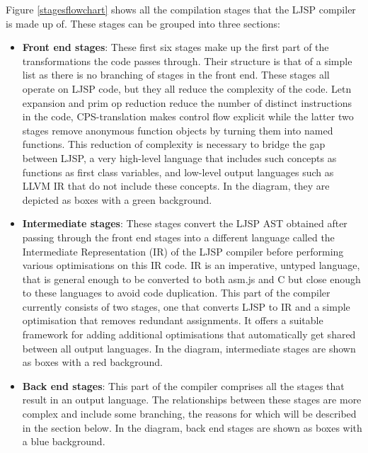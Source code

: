 \documentclass[11pt]{report}
\begin{document}
Figure \ref{stagesflowchart} shows all the compilation stages that the LJSP compiler is made up of. These stages  can be grouped into three sections:
\begin{itemize}
\item \textbf{Front end stages}: These first six stages make up the first part of the transformations the code passes through. Their structure is that of a simple list as there is no branching of stages in the front end. These stages all operate on LJSP code, but they all reduce the complexity of the code. Letn expansion and prim op reduction reduce the number of distinct instructions in the code, CPS-translation makes control flow explicit while the latter two stages remove anonymous function objects by turning them into named functions. This reduction of complexity is necessary to bridge the gap between LJSP, a very high-level language that includes such concepts as functions as first class variables, and low-level output languages such as LLVM IR that do not include these concepts. In the diagram, they are depicted as boxes with a green background.

\item \textbf{Intermediate stages}: These stages convert the LJSP AST obtained after passing through the front end stages into a different language called the Intermediate Representation (IR) of the LJSP compiler before performing various optimisations on this IR code. IR is an imperative, untyped language, that is general enough to be converted to both asm.js and C but close enough to these languages to avoid code duplication. This part of the compiler currently consists of two stages, one that converts LJSP to IR and a simple optimisation that removes redundant assignments. It offers a suitable framework for adding additional optimisations that automatically get shared between all output languages. In the diagram, intermediate stages are shown as boxes with a red background.

\item \textbf{Back end stages}: This part of the compiler comprises all the stages that result in an output language. The relationships between these stages are more complex and include some branching, the reasons for which will be described in the section below. In the diagram, back end stages are shown as boxes with a blue background.
\end{itemize}
\end{document}
